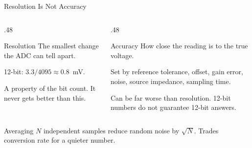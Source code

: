 \documentclass[9pt,aspectratio=169,xcolor=table]{beamer}
\begin{document}
\begin{frame}{Resolution Is Not Accuracy}
    \leavevmode
    \begin{columns}[T]
    \begin{column}{.48\textwidth}
        \begin{block}{Resolution}
            {\small The smallest change the ADC can \alert{tell apart}.}

            \vspace{1mm}
            {\small 12-bit: $3.3/4095 \approx 0.8$~mV.}
        \end{block}

        \vspace{2mm}
        {\small A property of the \alert{bit count}. It never gets
        better than this.}
    \end{column}
    \begin{column}{.48\textwidth}
        \begin{block}{Accuracy}
            {\small How close the reading is to the \alert{true} voltage.}

            \vspace{1mm}
            {\small Set by reference tolerance, offset, gain error,
            noise, source impedance, sampling time.}
        \end{block}

        \vspace{2mm}
        {\small Can be far worse than resolution. 12-bit numbers do
        not guarantee 12-bit answers.}
    \end{column}
    \end{columns}

    \vspace{3mm}
    \begin{block}{Averaging}
        $N$ independent samples reduce random noise by $\sqrt{N}$.
        Trades conversion rate for a quieter number.
    \end{block}
\end{frame}
\end{document}
